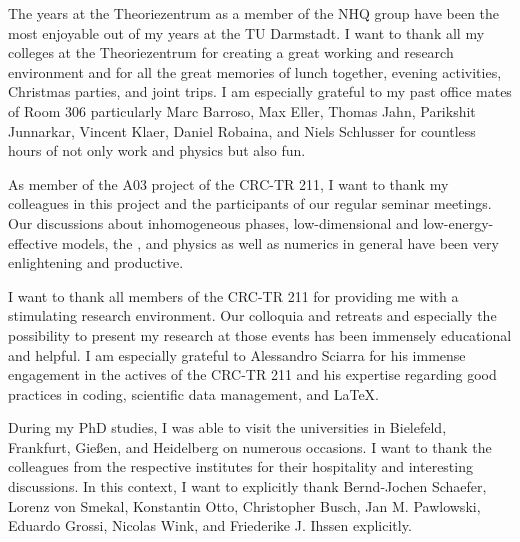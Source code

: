 The years at the Theoriezentrum as a member of the NHQ group have been the most enjoyable out of my years at the TU Darmstadt.
I want to thank all my colleges at the Theoriezentrum for creating a great working and research environment and for all the great memories of lunch together, evening activities, Christmas parties, and joint trips.
I am especially grateful to my past office mates of Room 306 \dash{} particularly Marc Barroso, Max Eller, Thomas Jahn, Parikshit Junnarkar, Vincent Klaer, Daniel Robaina, and Niels Schlusser \dash{} for countless hours of not only work and physics but also fun.\bigskip


As member of the A03 project of the CRC-TR 211, I want to thank my colleagues in this project and the participants of our regular seminar meetings.
Our discussions about inhomogeneous phases, low-dimensional and low-energy-effective models, the \frg{}, and physics as well as numerics in general have been very enlightening and productive.

I want to thank all members of the CRC-TR 211 for providing me with a stimulating research environment.
Our colloquia and retreats and especially the possibility to present my research at those events has been immensely educational and helpful.
I am especially grateful to Alessandro Sciarra for his immense engagement in the actives of the CRC-TR 211 and his expertise regarding good practices in coding, scientific data management, and \LaTeX.\bigskip

During my PhD studies, I was able to visit the universities in Bielefeld, Frankfurt, Gießen, and Heidelberg on numerous occasions.
I want to thank the colleagues from the respective institutes for their hospitality and interesting discussions.
In this context, I want to explicitly thank Bernd-Jochen Schaefer, Lorenz von Smekal, Konstantin Otto, Christopher Busch, Jan M. Pawlowski, Eduardo Grossi, Nicolas Wink, and Friederike J. Ihssen explicitly.\bigskip

